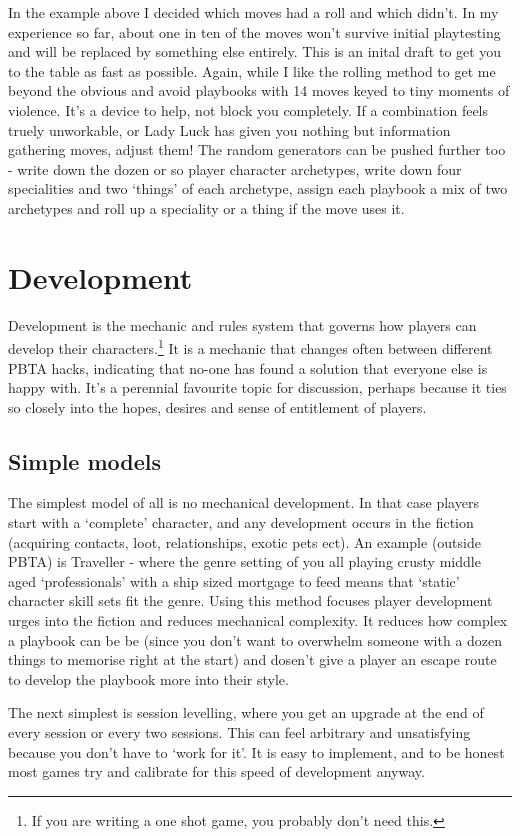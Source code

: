 \documentclass{tufte-handout}
\begin{document}
In the example above I decided which moves had a roll and which didn't. In my experience so far, about one in  ten of the moves won't survive initial playtesting and will be replaced by something else entirely. This is an inital draft to get you to the table as fast as possible. Again, while I like the rolling method to get me beyond the obvious and avoid playbooks with 14 moves keyed to tiny moments of violence. It's a device to help, not block you completely. If a combination feels truely unworkable, or Lady Luck has given you nothing but information gathering moves, adjust them! The random generators can be pushed further too - write down the dozen or so player character archetypes, write down four specialities and two `things' of each archetype, assign each playbook a mix of two archetypes and roll up a speciality or a thing if the move uses it. 

\section{ Development}
Development is the mechanic and rules system that governs how players can develop their characters.\footnote{If you are writing a one shot game, you probably don't need this. }
It is a mechanic that changes often between different PBTA hacks, indicating that no-one has found a solution that everyone else is happy with. It's a perennial favourite topic for discussion, perhaps because it  ties so closely into the hopes, desires and sense of entitlement of players.

\subsection{Simple models}
The simplest model of all is no mechanical development. In that case players start with a `complete' character, and any development occurs in the fiction (acquiring contacts, loot, relationships, exotic pets ect). An example (outside PBTA) is Traveller - where the genre setting of you all playing crusty middle aged `professionals' with a ship sized mortgage to feed means that `static' character skill sets fit the genre. Using this method  focuses player development urges into the fiction and reduces mechanical complexity. It reduces how complex a playbook can be be (since you don't want to overwhelm someone with a dozen things to memorise right at the start) and dosen't give a player an escape route to develop the playbook more into their style. 

The next simplest is session levelling, where you get an upgrade at the end of every session or every two sessions. This can feel arbitrary and unsatisfying because you don't have to `work for it'. It is easy to implement, and to be honest most games try and calibrate for this speed of development anyway. 
\end{document}
